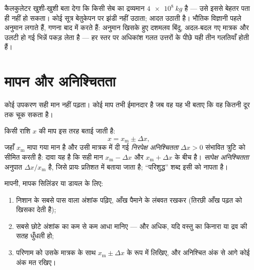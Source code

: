 \begin{remark}[इसकी ज़रूरत क्यों]\label{rem:g10:orders-of-magnitude:sanity}
कैलकुलेटर खुशी-खुशी बता देगा कि किसी सेब का द्रव्यमान $\qty{4e8}{kg}$ है ---
उसे इससे बेहतर पता ही नहीं हो सकता। कोई सूत्र बेतुकेपन पर झंडी नहीं
उठाता; आदत उठाती है। भौतिक विज्ञानी पहले अनुमान लगाते हैं, गणना बाद में
करते हैं: अनुमान खिसके हुए दशमलव बिंदु, अदल-बदल गए मात्रक और
उलटी हो गई भिन्नें पकड़ लेता है --- हर स्तर पर अधिकांश गलत उत्तरों के
पीछे यही तीन गलतियाँ होती हैं।
\end{remark}

\section{मापन और अनिश्चितता}

कोई उपकरण सही मान नहीं पढ़ता। कोई माप तभी ईमानदार है जब वह यह भी बताए
कि वह कितनी दूर तक चूक सकता है।

\begin{definition}[निरपेक्ष और सापेक्ष अनिश्चितता]\label{def:g10:orders-of-magnitude:uncertainty}
किसी राशि $x$ की माप इस तरह बताई जाती है:
\[
x = x_{\text{m}} \pm \Delta x ,
\]
जहाँ $x_{\text{m}}$ मापा गया मान है और उसी मात्रक में दी गई
\emph{निरपेक्ष अनिश्चितता} $\Delta x > 0$ संभावित
त्रुटि को सीमित करती है: दावा यह है कि सही मान $x_{\text{m}} - \Delta x$ और $x_{\text{m}} + \Delta x$ के
बीच है। \emph{सापेक्ष अनिश्चितता} अनुपात
$\Delta x / x_{\text{m}}$ है, जिसे प्रायः प्रतिशत में बताया जाता है; ``परिशुद्ध'' शब्द
इसी को नापता है।
\end{definition}

\begin{method}[अंशांकित उपकरण पढ़ना]\label{met:g10:orders-of-magnitude:reading}
मापनी, मापक सिलिंडर या डायल के लिए:
\begin{enumerate}
  \item निशान के सबसे पास वाला अंशांक पढ़िए, आँख पैमाने के लंबवत रखकर
        (तिरछी आँख पढ़त को खिसका देती है);
  \item सबसे छोटे अंशांक का कम से कम आधा 
        मानिए --- और अधिक, यदि वस्तु का किनारा या द्रव की सतह धुँधली
        हो;
  \item परिणाम को उसके मात्रक के साथ $x_{\text{m}} \pm \Delta x$ के रूप में
        लिखिए, और अनिश्चित अंक से आगे कोई अंक मत रखिए।
\end{enumerate}
\end{method}

